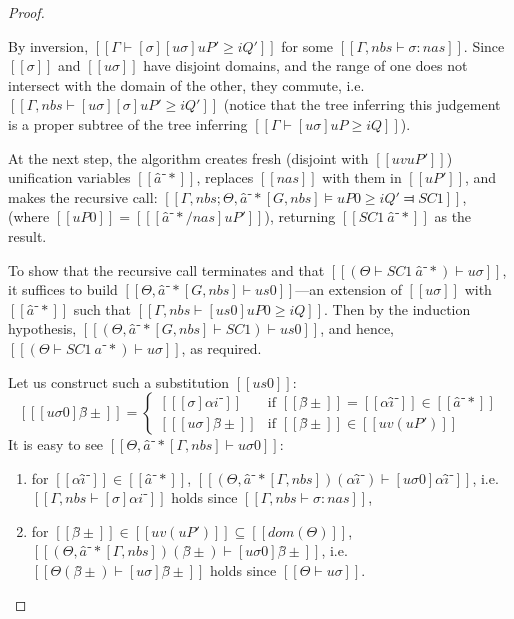 \begin{proof}
\begin{caseof}
      By inversion, $[[ Γ ⊢ [σ][uσ]uP' ≥ iQ' ]]$ for some $[[Γ, nbs ⊢ σ : nas]]$.
      Since $[[σ]]$ and $[[uσ]]$ have disjoint domains,
      and the range of one does not intersect with the domain of the other,
      they commute, i.e. $[[ Γ, nbs ⊢ [uσ][σ]uP' ≥ iQ' ]]$
      (notice that the tree inferring this judgement is 
      a proper subtree of the tree inferring 
      $[[ Γ ⊢ [uσ]uP ≥ iQ ]]$).

      At the next step, 
      the algorithm creates fresh (disjoint with $[[uv uP']]$) 
      unification variables $[[â⁻*]]$, replaces $[[nas]]$ with them in $[[ uP' ]]$,
      and makes the recursive call:
      $[[Γ, nbs; Θ, â⁻*[G, nbs] ⊨ uP0 ≥ iQ' ⫤ SC1]]$,
      (where $[[uP0]] = [[ [â⁻*/nas]uP' ]]$),
      returning $[[SC1 \ {â⁻*}]]$ as the result.

      To show that the recursive call terminates and that 
      $[[(Θ  ⊢  SC1 \ {â⁻*}) ⊢ uσ]]$,
      it suffices to build $[[Θ, â⁻*[G, nbs] ⊢ us0]]$---an extension of $[[uσ]]$ with
      $[[â⁻*]]$ such that $[[Γ, nbs ⊢ [us0]uP0 ≥ iQ]]$.
      Then by the induction hypothesis, $[[(Θ, â⁻*[G, nbs] ⊢ SC1) ⊢ us0]]$,
      and hence, $[[(Θ  ⊢  SC1 \ {â⁻*}) ⊢ uσ]]$, as required.

      Let us construct such a substitution $[[us0]]$:
        \[
            [[ [uσ0]β̂± ]]  = 
            \begin{cases}
               [[ [σ]αi⁻ ]] & \text{if } [[β̂±]] = [[αî⁻]] \in [[â⁻*]] \\
               [[ [uσ]β̂± ]] & \text{if } [[β̂±]] \in [[ uv(uP') ]]
            \end{cases}
       \]
       It is easy to see $[[Θ, â⁻*[Γ, nbs] ⊢ uσ0]]$:
       \begin{enumerate}
            \item for $[[αî⁻]] \in [[â⁻*]]$, $[[ (Θ, â⁻*[Γ, nbs])(αî⁻) ⊢ [uσ0] αî⁻]]$, 
            i.e. $[[ Γ, nbs ⊢ [σ]αi⁻ ]]$ holds since $[[Γ, nbs ⊢ σ : nas]]$,
            \item for $[[β̂±]] \in [[ uv(uP') ]] \subseteq [[dom(Θ)]]$, $[[ (Θ, â⁻*[Γ, nbs])(β̂±) ⊢ [uσ0] β̂± ]]$,
            i.e. $[[Θ(β̂±) ⊢ [uσ] β̂± ]]$ holds since $[[Θ ⊢ uσ]]$.
       \end{enumerate}


\end{caseof}
\end{proof}
